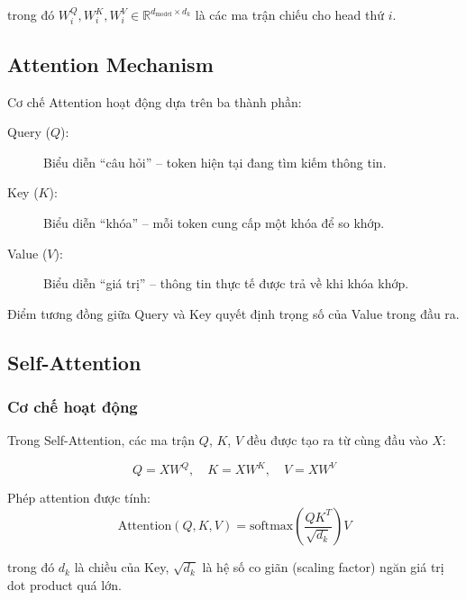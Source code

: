 \noindent trong đó $W_i^Q, W_i^K, W_i^V \in \mathbb{R}^{d_{\text{model}} \times d_k}$ là các ma trận chiếu cho head thứ $i$.

\subsection{Attention Mechanism}
\label{subsec:attention}

Cơ chế Attention hoạt động dựa trên ba thành phần:

\begin{description}
    \item[Query ($Q$):] Biểu diễn ``câu hỏi'' -- token hiện tại đang tìm kiếm thông tin.
    \item[Key ($K$):] Biểu diễn ``khóa'' -- mỗi token cung cấp một khóa để so khớp.
    \item[Value ($V$):] Biểu diễn ``giá trị'' -- thông tin thực tế được trả về khi khóa khớp.
\end{description}

Điểm tương đồng giữa Query và Key quyết định trọng số của Value trong đầu ra.

\subsection{Self-Attention}
\label{subsec:self_attention}

\subsubsection*{Cơ chế hoạt động}

Trong Self-Attention, các ma trận $Q$, $K$, $V$ đều được tạo ra từ cùng đầu vào $X$:

\begin{equation}
    Q = XW^Q, \quad K = XW^K, \quad V = XW^V
\end{equation}

Phép attention được tính:
\begin{equation}
    \text{Attention}(Q, K, V) = \text{softmax}\left(\frac{QK^T}{\sqrt{d_k}}\right) V
    \label{eq:self_attention}
\end{equation}

\noindent trong đó $d_k$ là chiều của Key, $\sqrt{d_k}$ là hệ số co giãn (scaling factor) ngăn giá trị dot product quá lớn.

